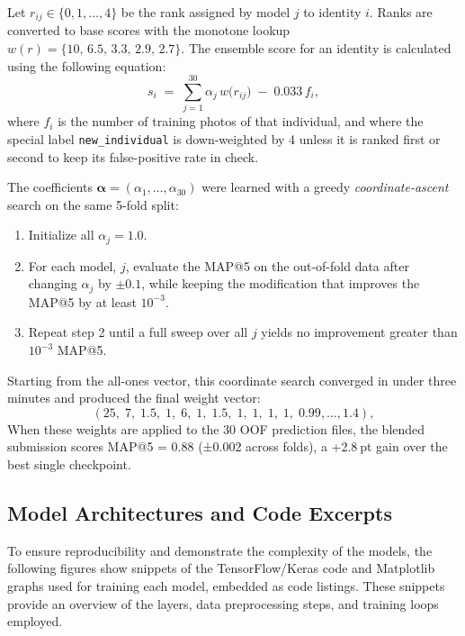 \documentclass[twocolumn]{article}
\begin{document}
Let \(r_{ij}\!\in\!\{0,1,\dots,4\}\) be the rank assigned by model \(j\) to identity \(i\).
Ranks are converted to base scores with the monotone lookup \(w(r)=\{10,\,6.5,\,3.3,\,2.9,\,2.7\}\).
The ensemble score for an identity is calculated using the following equation:
\begin{equation}
s_i\;=\;\sum_{j=1}^{30}\alpha_j\,w\!\bigl(r_{ij}\bigr)\;-\;0.033\,f_i,
\end{equation}
where \(f_i\) is the number of training photos of that individual, and where the special label \texttt{new\_individual} is down-weighted by 4 unless it is ranked first or second to keep its false-positive rate in check.

The coefficients \(\boldsymbol{\alpha} \!=\! (\alpha_1,\dots,\alpha_{30})\) were learned with a greedy \emph{coordinate-ascent} search on the same 5-fold split:

\begin{enumerate}
  \item Initialize all \(\alpha_j = 1.0\).
  \item For each model, \(j\), evaluate the MAP@5 on the out-of-fold data after changing \(\alpha_j\) by \(\pm0.1\), while keeping the modification that improves the MAP@5 by at least $10^{-3}$.
  \item Repeat step 2 until a full sweep over all \(j\) yields no improvement greater than $10^{-3}$ MAP@5.
\end{enumerate}

Starting from the all-ones vector, this coordinate search converged in under three minutes and produced the final weight vector:
\begin{equation}
(25,\;7,\;1.5,\;1,\;6,\;1,\;1.5,\;1,\;1,\;1,\;1,\;0.99,\ldots,1.4),
\end{equation}
When these weights are applied to the 30 OOF prediction files, the blended submission scores MAP@5 = 0.88 (±0.002 across folds), a +2.8 pt gain over the best single checkpoint.

\subsection{Model Architectures and Code Excerpts}

To ensure reproducibility and demonstrate the complexity of the models, the following figures show snippets of the TensorFlow/Keras code and Matplotlib graphs used for training each model, embedded as code listings. These snippets provide an overview of the layers, data preprocessing steps, and training loops employed.
\end{document}
